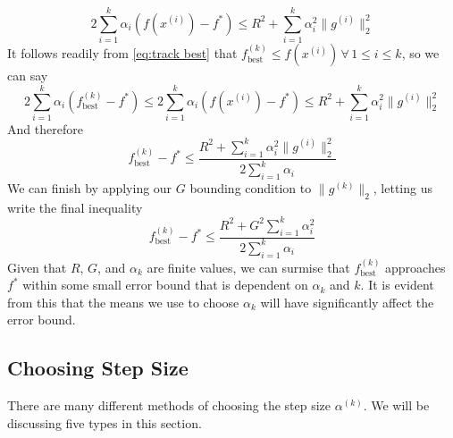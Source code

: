 \documentclass[journal,onecolumn]{IEEEtran}
\DeclareMathOperator{\best}{best}
\let\oldforall\forall
\renewcommand{\forall}{ \, \oldforall \, }
\begin{document}
\begin{equation}
    2\sum^k_{i=1}\alpha_i (f(x^{(i)})-f^*) \leq R^2  + \sum^k_{i=1}\alpha^2_i\|g^{(i)}\|^2_2
\end{equation}
It follows readily from \eqref{eq:track best} that \(f^{(k)}_{\best} \leq f(x^{(i)}) \forall 1 \leq i \leq k\), so we can say
\begin{equation}
    2\sum^k_{i=1}\alpha_i (f^{(k)}_{\best}-f^*) \leq 2\sum^k_{i=1}\alpha_i (f(x^{(i)})-f^*) \leq R^2  + \sum^k_{i=1}\alpha^2_i\|g^{(i)}\|^2_2
\end{equation}
And therefore
\begin{equation}\label{eq:general bound}
    f^{(k)}_{\best}-f^* \leq \frac{R^2  + \sum^k_{i=1}\alpha^2_i\|g^{(i)}\|^2_2}{2\sum^k_{i=1}\alpha_i}
\end{equation}
We can finish by applying our \(G\) bounding condition to \(\|g^{(k)}\|_2\), letting us write the final inequality
\begin{equation}\label{eq:maximum bound}
    f^{(k)}_{\best}-f^* \leq \frac{R^2  + G^2 \sum^k_{i=1}\alpha^2_i}{2\sum^k_{i=1}\alpha_i}
\end{equation}
Given that \(R\), \(G\), and \(\alpha_k\) are finite values, we can surmise that \(f^{(k)}_{\best}\) approaches \(f^*\) within some small error bound that is dependent on \(\alpha_k\) and \(k\). It is evident from this that the means we use to choose \(\alpha_k\) will have significantly affect the error bound.

\subsection{Choosing Step Size}\label{sec:choosing step size}
There are many different methods of choosing the step size \(\alpha^{(k)}\). We will be discussing five types in this section.
\end{document}
